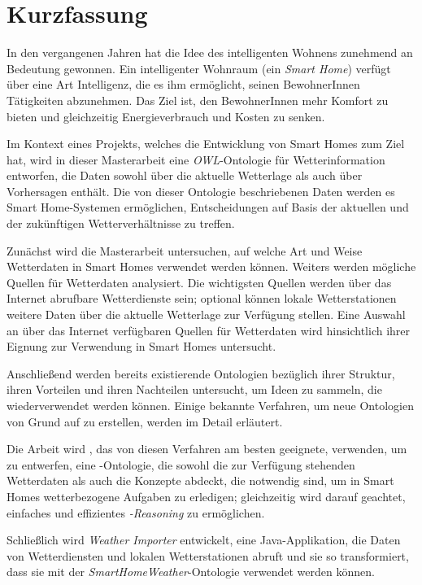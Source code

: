 \chapter*{Kurzfassung}

In den vergangenen Jahren hat die Idee des intelligenten Wohnens zunehmend an Bedeutung gewonnen. Ein intelligenter Wohnraum (ein \emph{Smart Home}) verfügt über eine Art Intelligenz, die es ihm ermöglicht, seinen BewohnerInnen Tätigkeiten abzunehmen. Das Ziel ist, den BewohnerInnen mehr Komfort zu bieten und gleichzeitig Energieverbrauch und Kosten zu senken.

Im Kontext eines Projekts, welches die Entwicklung von Smart Homes zum Ziel hat, wird in dieser Masterarbeit eine \emph{OWL}-Ontologie für Wetterinformation entworfen, die Daten sowohl über die aktuelle Wetterlage als auch über Vorhersagen enthält. Die von dieser Ontologie beschriebenen Daten werden es Smart Home-Systemen ermöglichen, Entscheidungen auf Basis der aktuellen und der zukünftigen Wetterverhältnisse zu treffen.

Zunächst wird die Masterarbeit untersuchen, auf welche Art und Weise Wetterdaten in Smart Homes verwendet werden können. Weiters werden mögliche Quellen für Wetterdaten analysiert. Die wichtigsten Quellen werden über das Internet abrufbare Wetterdienste sein; optional können lokale Wetterstationen weitere Daten über die aktuelle Wetterlage zur Verfügung stellen. Eine Auswahl an über das Internet verfügbaren Quellen für Wetterdaten wird hinsichtlich ihrer Eignung zur Verwendung in Smart Homes untersucht.

Anschließend werden bereits existierende Ontologien bezüglich ihrer Struktur, ihren Vorteilen und ihren Nachteilen untersucht, um Ideen zu sammeln, die wiederverwendet werden können. Einige bekannte Verfahren, um neue Ontologien von Grund auf zu erstellen, werden im Detail erläutert.

Die Arbeit wird \methontology, das von diesen Verfahren am besten geeignete, verwenden, um \smarthomeweather zu entwerfen, eine -Ontologie, die sowohl die zur Verfügung stehenden Wetterdaten als auch die Konzepte abdeckt, die notwendig sind, um in Smart Homes wetterbezogene Aufgaben zu erledigen; gleichzeitig wird darauf geachtet, einfaches und effizientes \emph{-Reasoning} zu ermöglichen.

Schließlich wird \emph{Weather Importer} entwickelt, eine Java-Applikation, die Daten von Wetterdiensten und lokalen Wetterstationen abruft und sie so transformiert, dass sie mit der \emph{Smart\-Home\-Weather}-Ontologie verwendet werden können.